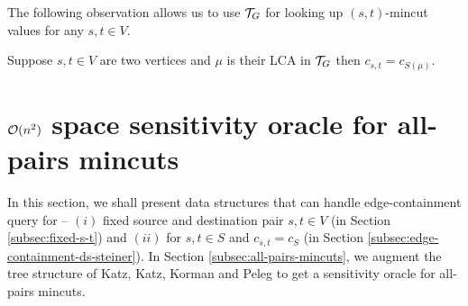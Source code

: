 The following observation allows us to use ${\cal T}_G$ for looking up $(s,t)$-mincut values for any $s,t\in V$.

\begin{observation}
\label{obs:(s,t)-mincut-lca}
Suppose $s,t \in V$ are two vertices and $\mu$ is their LCA in ${\cal T}_G$ then $c_{s,t}=c_{S(\mu)}$.
\end{observation}


\section{\texorpdfstring{${\cal O}(n^2)$}{Quadratic} space sensitivity oracle for all-pairs mincuts} \label{sec:n^2-space-sensitivity-oracle}






In this section, we shall present data structures that can handle edge-containment query for -- $(i)$ fixed source and destination pair $s,t\in V$ (in Section \ref{subsec:fixed-s-t}) and $(ii)$ for $s,t\in S$ and $c_{s,t}=c_S$ (in Section \ref{subsec:edge-containment-ds-steiner}). In Section \ref{subsec:all-pairs-mincuts}, we augment the tree structure of Katz, Katz, Korman and Peleg \cite{DBLP:journals/siamcomp/KatzKKP04} to get a sensitivity oracle for all-pairs mincuts. 

